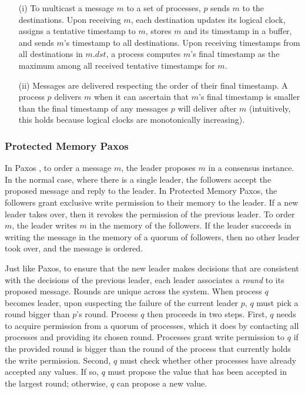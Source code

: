 \begin{itemize}
\item[(i)] To multicast a message $m$ to a set of processes, $p$ sends $m$ to the destinations.
Upon receiving $m$, each destination updates its logical clock, assigns a tentative timestamp to $m$, stores $m$ and its timestamp in a buffer, and sends $m$'s timestamp to all destinations.
Upon receiving timestamps from all destinations in $m.dst$, a process computes $m$'s final timestamp as the maximum among all received tentative timestamps for $m$.
\item[(ii)]Messages are delivered respecting the order of their final timestamp.
A process $p$ delivers $m$ when it can ascertain that $m$'s final timestamp is smaller than the final timestamp of any messages $p$ will deliver after $m$ (intuitively, this holds because logical clocks are monotonically increasing).
\end{itemize}

\subsubsection{Protected Memory Paxos}
\label{sec:PMP}

In Paxos \cite{L98}, to order a message $m$, the leader proposes $m$ in a consensus instance.
In the normal case, where there is a single leader, the followers accept the proposed message and reply to the leader.
In Protected Memory Paxos, the followers grant exclusive write permission to their memory to the leader.
If a new leader takes over, then it revokes the permission of the previous leader.
To order $m$, the leader writes $m$ in the memory of the followers.
If the leader succeeds in writing the message in the memory of a quorum of followers, then no other leader took over, and the message is ordered.

Just like Paxos, to ensure that the new leader makes decisions that are consistent with the decisions of the previous leader, each leader associates a \emph{round} to its proposed message.
Rounds are unique across the system.
When process $q$ becomes leader, upon suspecting the failure of the current leader $p$, $q$ must pick a round bigger than $p$'s round.
Process $q$ then proceeds in two steps.
First, $q$ needs to acquire permission from a quorum of processes, which it does by contacting all processes and providing its chosen round.
Processes grant write permission to $q$ if the provided round is bigger than the round of the process that currently holds the write permission.
Second, $q$ must check whether other processes have already accepted any values.
If so, $q$ must propose the value that has been accepted in the largest round; otherwise, $q$ can propose a new value.

